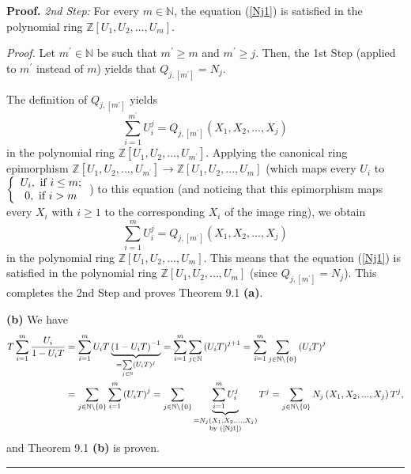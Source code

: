 \documentclass[numbers=enddot,12pt,final,onecolumn,notitlepage]{scrartcl}%
\newenvironment{proof}[1][Proof]{\noindent\textbf{#1.} }{\ \rule{0.5em}{0.5em}}
\begin{document}
\begin{proof}
\textit{2nd Step:} For every $m\in\mathbb{N}$, the equation (\ref{Nj1}) is
satisfied in the polynomial ring $\mathbb{Z}\left[  U_{1},U_{2},...,U_{m}%
\right]  $.

\textit{Proof.} Let $m^{\prime}\in\mathbb{N}$ be such that $m^{\prime}\geq m$
and $m^{\prime}\geq j$. Then, the 1st Step (applied to $m^{\prime}$ instead of
$m$) yields that $Q_{j,\left[  m^{\prime}\right]  }=N_{j}.$

The definition of $Q_{j,\left[  m^{\prime}\right]  }$ yields
\[
\sum_{i=1}^{m^{\prime}}U_{i}^{j}=Q_{j,\left[  m^{\prime}\right]  }\left(
X_{1},X_{2},...,X_{j}\right)
\]
in the polynomial ring $\mathbb{Z}\left[  U_{1},U_{2},...,U_{m^{\prime}%
}\right]  $. Applying the canonical ring epimorphism $\mathbb{Z}\left[
U_{1},U_{2},...,U_{m^{\prime}}\right]  \rightarrow\mathbb{Z}\left[
U_{1},U_{2},...,U_{m}\right]  $ (which maps every $U_{i}$ to $\left\{
\begin{array}
[c]{c}%
U_{i},\text{ if }i\leq m;\\
0,\text{ if }i>m
\end{array}
\right.  $) to this equation (and noticing that this epimorphism maps every
$X_{i}$ with $i\geq1$ to the corresponding $X_{i}$ of the image ring), we
obtain%
\[
\sum_{i=1}^{m}U_{i}^{j}=Q_{j,\left[  m^{\prime}\right]  }\left(  X_{1}%
,X_{2},...,X_{j}\right)
\]
in the polynomial ring $\mathbb{Z}\left[  U_{1},U_{2},...,U_{m}\right]  .$
This means that the equation (\ref{Nj1}) is satisfied in the polynomial ring
$\mathbb{Z}\left[  U_{1},U_{2},...,U_{m}\right]  $ (since $Q_{j,\left[
m^{\prime}\right]  }=N_{j}$). This completes the 2nd Step and proves Theorem
9.1 \textbf{(a)}.

\textbf{(b)} We have%
\begin{align*}
T\sum_{i=1}^{m}\dfrac{U_{i}}{1-U_{i}T}  &  =\sum_{i=1}^{m}U_{i}%
T\underbrace{\left(  1-U_{i}T\right)  ^{-1}}_{=\sum\limits_{j\in\mathbb{N}%
}\left(  U_{i}T\right)  ^{j}}=\sum_{i=1}^{m}\sum_{j\in\mathbb{N}}\left(
U_{i}T\right)  ^{j+1}=\sum_{i=1}^{m}\sum_{j\in\mathbb{N}\setminus\left\{
0\right\}  }\left(  U_{i}T\right)  ^{j}\\
&  =\sum_{j\in\mathbb{N}\setminus\left\{  0\right\}  }\sum_{i=1}^{m}\left(
U_{i}T\right)  ^{j}=\sum_{j\in\mathbb{N}\setminus\left\{  0\right\}
}\underbrace{\sum_{i=1}^{m}U_{i}^{j}}_{\substack{=N_{j}\left(  X_{1}%
,X_{2},...,X_{j}\right)  \\\text{by (\ref{Nj1})}}}T^{j}=\sum_{j\in
\mathbb{N}\setminus\left\{  0\right\}  }N_{j}\left(  X_{1},X_{2}%
,...,X_{j}\right)  T^{j},
\end{align*}
and Theorem 9.1 \textbf{(b)} is proven.
\end{proof}
\end{document}
